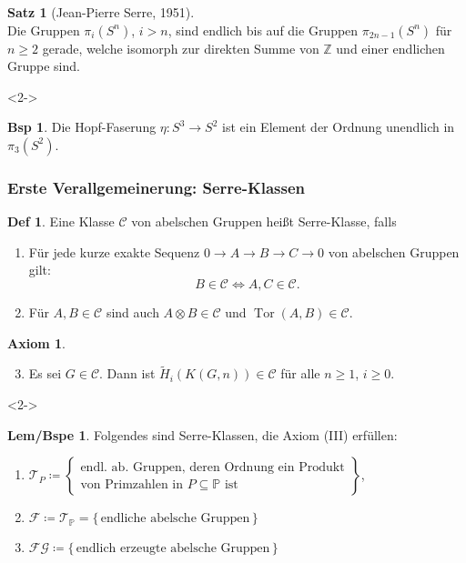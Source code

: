 \documentclass{beamer}
\newcommand{\Z}{\mathbb{Z}} %
\newcommand{\SC}{\mathcal{C}} %
\newcommand{\FG}{\mathcal{FG}} %
\newcommand{\T}{\mathcal{T}} %
\newcommand{\F}{\mathcal{F}} %
\DeclareMathOperator{\Tor}{Tor} %
\newcommand{\Primes}{\mathbb{P}} %
\theoremstyle{definition}
\newtheorem*{defn}{Def} %
\newtheorem*{satz}{Satz}
\newtheorem*{bsp}{Bsp} %
\newtheorem*{axiom}{Axiom}
\newtheorem*{lembspe}{Lem/Bspe} %
\renewcommand{\emph}[1]{\textcolor{Emph}{#1}}
\begin{document}
\begin{frame}
  \begin{satz}[Jean-Pierre Serre, 1951] \mbox{} \\
    Die Gruppen $\pi_i(S^n)$, $i > n$, sind endlich bis auf die Gruppen $\pi_{2n-1}(S^n)$ für $n \geq 2$ gerade, welche isomorph zur direkten Summe von $\Z$ und einer endlichen Gruppe sind.
  \end{satz}
  
  \begin{visibleenv}<2->
  \begin{bsp}
    Die Hopf-Faserung $\eta : S^3 \to S^2$ ist ein Element der Ordnung unendlich in $\pi_3(S^2)$.
  \end{bsp}
  \end{visibleenv}
\end{frame}

\begin{frame}
  \frametitle{Erste Verallgemeinerung: Serre-Klassen}
  \begin{defn}
    Eine Klasse $\SC$ von abelschen Gruppen heißt \emph{Serre-Klasse}, falls
    \begin{enumerate}[label=(\Roman*)]
      \item Für jede kurze exakte Sequenz $0 \to A \to B \to C \to 0$ von abelschen Gruppen gilt:
      \[
        B \in \SC \iff A, C \in \SC.
      \]
      \item Für $A, B \in \SC$ sind auch $A \otimes B \in \SC$ und $\Tor(A, B) \in \SC$.
    \end{enumerate}
  \end{defn}
  \begin{axiom} \mbox{} \\
    \begin{enumerate}[label=(\Roman*)]
      \setcounter{enumi}{2}
      \item Es sei $G \in \SC$.
      Dann ist $\widetilde{H}_i(K(G, n)) \in \SC$ für alle $n \geq 1$, $i \geq 0$.
    \end{enumerate}
  \end{axiom}

  \begin{visibleenv}<2->
  \begin{lembspe}
    Folgendes sind Serre-Klassen, die Axiom (III) erfüllen:
    \begin{enumerate}[label=\alph*)]
      \item $\T_P \coloneqq \left\{ \begin{array}{l}
        \text{endl. ab. Gruppen, deren Ordnung ein Produkt} \\
        \text{von Primzahlen in $P \subseteq \Primes$ ist}
      \end{array} \right\}$,
      \item $\F \coloneqq \T_\Primes = \{\, \text{endliche abelsche Gruppen} \,\}$
      \item $\FG \coloneqq \{\, \text{endlich erzeugte abelsche Gruppen} \,\}$
    \end{enumerate}
  \end{lembspe}
  \end{visibleenv}
\end{frame}
\end{document}
